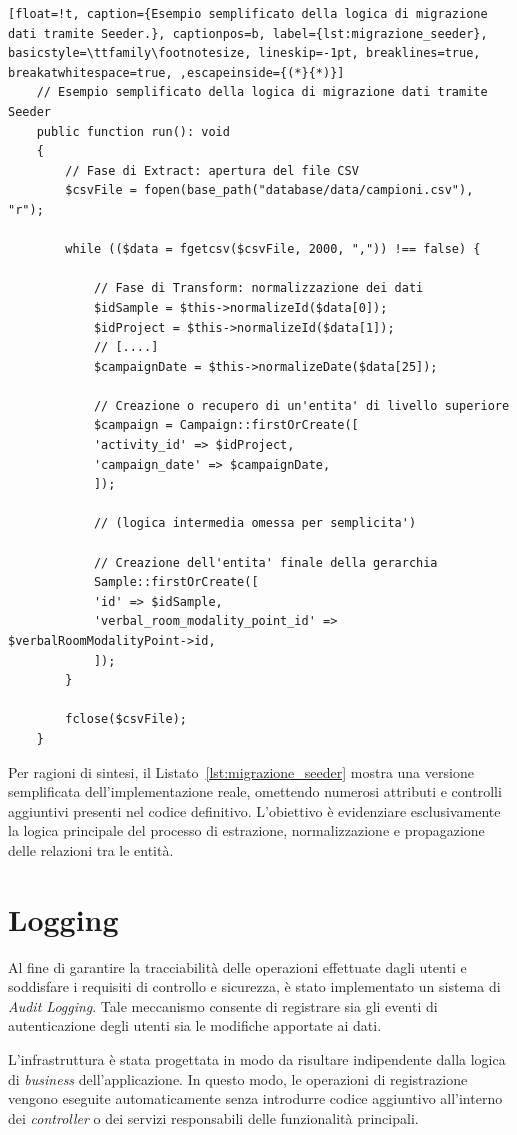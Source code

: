 \begin{lstlisting}[float=!t, caption={Esempio semplificato della logica di migrazione dati tramite Seeder.}, captionpos=b, label={lst:migrazione_seeder}, basicstyle=\ttfamily\footnotesize, lineskip=-1pt, breaklines=true, breakatwhitespace=true, ,escapeinside={(*}{*)}]
	// Esempio semplificato della logica di migrazione dati tramite Seeder
	public function run(): void
	{
		// Fase di Extract: apertura del file CSV
		$csvFile = fopen(base_path("database/data/campioni.csv"), "r");
		
		while (($data = fgetcsv($csvFile, 2000, ",")) !== false) {
			
			// Fase di Transform: normalizzazione dei dati
			$idSample = $this->normalizeId($data[0]);
			$idProject = $this->normalizeId($data[1]);
			// [....]
			$campaignDate = $this->normalizeDate($data[25]);
			
			// Creazione o recupero di un'entita' di livello superiore
			$campaign = Campaign::firstOrCreate([
			'activity_id' => $idProject,
			'campaign_date' => $campaignDate,
			]);
			
			// (logica intermedia omessa per semplicita')
			
			// Creazione dell'entita' finale della gerarchia
			Sample::firstOrCreate([
			'id' => $idSample,
			'verbal_room_modality_point_id' => $verbalRoomModalityPoint->id,
			]);
		}
		
		fclose($csvFile);
	}
\end{lstlisting}
Per ragioni di sintesi, il Listato~\ref{lst:migrazione_seeder} mostra una versione semplificata dell'implementazione reale, omettendo numerosi attributi e controlli aggiuntivi presenti nel codice definitivo. L'obiettivo è evidenziare esclusivamente la logica principale del processo di estrazione, normalizzazione e propagazione delle relazioni tra le entità.



\section{Logging}
Al fine di garantire la tracciabilità delle operazioni effettuate dagli utenti e soddisfare i requisiti di controllo e sicurezza, è stato implementato un sistema di \textit{Audit Logging}. Tale meccanismo consente di registrare sia gli eventi di autenticazione degli utenti sia le modifiche apportate ai dati.

L'infrastruttura è stata progettata in modo da risultare indipendente dalla logica di \textit{business} dell'applicazione. In questo modo, le operazioni di registrazione vengono eseguite automaticamente senza introdurre codice aggiuntivo all'interno dei \textit{controller} o dei servizi responsabili delle funzionalità principali.

